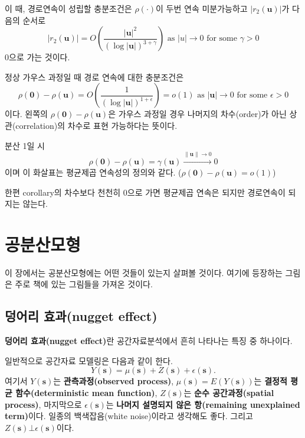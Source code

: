 \documentclass[b5paper,]{scrbook}
\theoremstyle{plain}
\theoremstyle{definition}
\numberwithin{equation}{section}
\let\BeginKnitrBlock\begin \let\EndKnitrBlock\end
\begin{document}
이 때, 경로연속이 성립할 충분조건은 \(\rho (\cdot)\)이 두번 연속
미분가능하고 \(|r_{2}(\mathbf{u})|\)가 다음의 순서로
\[|r_{2}(\mathbf{u})|=O(\frac{|\mathbf{u}|^{2}}{(\log |\mathbf{u}|)^{3+\gamma}}) \text{ as } |u| \rightarrow 0 \text{ for some } \gamma >0\]
0으로 가는 것이다.

\BeginKnitrBlock{corollary}
\protect\hypertarget{cor:unnamed-chunk-192}{}{\label{cor:unnamed-chunk-192}
}정상 가우스 과정일 때 경로 연속에 대한 충분조건은
\[\rho(\mathbf{0})-\rho(\mathbf{u})=O(\frac{1}{(\log |\mathbf{u}|)^{1+\epsilon}})=o(1) \text{ as } |\mathbf{u}| \rightarrow 0 \text{ for some } \epsilon > 0\]
이다. 왼쪽의 \(\rho(\mathbf{0})-\rho(\mathbf{u})\)은 가우스 과정일 경우
나머지의 차수(order)가 아닌 상관(correlation)의 차수로 표현 가능하다는
뜻이다.
\EndKnitrBlock{corollary}

분산 1일 시
\[\rho(\mathbf{0})-\rho(\mathbf{u})=\gamma(\mathbf{u}) \stackrel{\|\mathbf{u}\| \rightarrow 0}{\rightarrow} 0\]
이며 이 화살표는 평균제곱 연속성의 정의와 같다.
(\(\rho(\mathbf{0})-\rho(\mathbf{u})=o(1)\))

한편 corollary의 차수보다 천천히 0으로 가면 평균제곱 연속은 되지만
경로연속이 되지는 않는다.

\chapter{공분산모형}\label{covmodel}

이 장에서는 공분산모형에는 어떤 것들이 있는지 살펴볼 것이다. 여기에
등장하는 그림은 주로 \citep{Montero2015} 책에 있는 그림들을 가져온
것이다.

\section{덩어리 효과(nugget effect)}\label{-nugget-effect}

\textbf{덩어리 효과(nugget effect)}란 공간자료분석에서 흔히 나타나는
특징 중 하나이다.

일반적으로 공간자료 모델링은 다음과 같이 한다.
\[Y(\mathbf{s})=\mu(\mathbf{s})+Z(\mathbf{s})+\epsilon(\mathbf{s}).\]
여기서 \(Y(\mathbf{s})\)는 \textbf{관측과정(observed process)},
\(\mu(\mathbf{s})=E(Y(\mathbf{s}))\)는 \textbf{결정적 평균
함수(deterministic mean function)}, \(Z(\mathbf{s})\)는 \textbf{순수
공간과정(spatial process)}, 마지막으로 \(\epsilon(\mathbf{s})\)는
\textbf{나머지 설명되지 않은 항(remaining unexplained term)}이다. 일종의
백색잡음(white noise)이라고 생각해도 좋다. 그리고
\(Z(\mathbf{s}) \bot \epsilon(\mathbf{s})\)이다.
\end{document}
